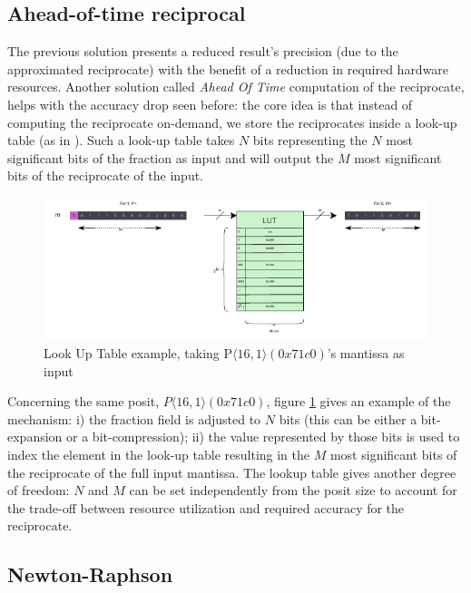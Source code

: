 \subsection{Ahead-of-time reciprocal}\label{aot_reciprocal_lut_technique}

The previous solution presents a reduced result's precision (due to the approximated reciprocate) with the benefit of a reduction in required hardware resources.
Another solution called \textit{Ahead Of Time} computation of the reciprocate, helps with the accuracy drop seen before: the core idea is that instead of computing the reciprocate on-demand, we store the reciprocates inside a look-up table (as in \cite{PACoGen}). Such a look-up table takes $N$ bits representing the $N$ most significant bits of the fraction as input and will output the $M$ most significant bits of the reciprocate of the input.

\begin{figure}[h!]
    \begin{center}
    \includegraphics[width=1\textwidth]{figures/lut.drawio.pdf}
    \caption{Look Up Table example, taking P$\langle 16,1 \rangle(0x71c0)$'s mantissa as input}
    \label{fig:lut_drawio_example}
    \end{center}
\end{figure}

Concerning the same posit, $P\langle 16,1 \rangle(0x71c0)$, figure \ref{fig:lut_drawio_example} gives an example of the mechanism: i) the fraction field is adjusted to $N$ bits (this can be either a bit-expansion or a bit-compression); ii) the value represented by those bits is used to index the element in the look-up table resulting in the $M$ most significant bits of the reciprocate of the full input mantissa.
The lookup table gives another degree of freedom: $N$ and $M$ can be set independently from the posit size to account for the trade-off between resource utilization and required accuracy for the reciprocate.


\subsection{Newton-Raphson}\label{Newton_Raphson}


